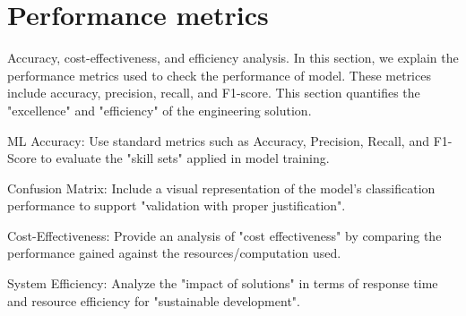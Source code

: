 \section{Performance metrics} 

Accuracy, cost-effectiveness, and efficiency analysis. In this section, we explain the performance metrics used to check the performance of model. These metrices include accuracy, precision, recall, and F1-score. This section quantifies the "excellence" and "efficiency" of the engineering solution.

ML Accuracy: Use standard metrics such as Accuracy, Precision, Recall, and F1-Score to evaluate the "skill sets" applied in model training.

Confusion Matrix: Include a visual representation of the model's classification performance to support "validation with proper justification".

Cost-Effectiveness: Provide an analysis of "cost effectiveness" by comparing the performance gained against the resources/computation used.

System Efficiency: Analyze the "impact of solutions" in terms of response time and resource efficiency for "sustainable development".
